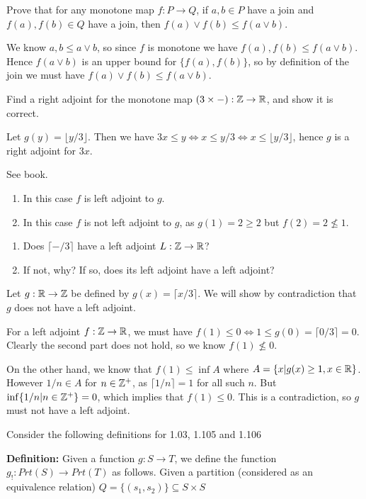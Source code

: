 Prove that for any monotone map $f:P\to Q$, if $a, b\in P$ have a join and $f(a), f(b)\in Q$ have a join, then $f(a)\lor f(b)\leq f(a\lor b)$.

\solution
We know $a,b\leq a\lor b$, so since $f$ is monotone we have $f(a), f(b)\leq f(a\lor b)$.  Hence $f(a\lor b)$ is an upper bound for $\{f(a), f(b)\}$, so by definition of the join we must have $f(a)\lor f(b)\leq f(a\lor b)$.

Find a right adjoint for the monotone map $(3\times -):\mathbb{Z}\to\mathbb{R}$, and show it is correct.

\solution
Let $g(y) = \lfloor y/3 \rfloor$.  Then we have $3x \leq y \iff x\leq y/3 \iff x\leq \lfloor y/3\rfloor$, hence $g$ is a right adjoint for $3x$.

See book.

\solution
\begin{enumerate}
	\item In this case $f$ is left adjoint to $g$.
	\item In this case $f$ is not left adjoint to $g$, as $g(1)=2\geq 2$ but $f(2)=2\nleq 1$.
\end{enumerate}

\begin{enumerate}
	\item Does $\lceil -/3\rceil$ have a left adjoint $L:\mathbb{Z}\to\mathbb{R}$?
	\item If not, why?  If so, does its left adjoint have a left adjoint?
\end{enumerate}

\solution
Let $g:\mathbb{R}\to\mathbb{Z}$ be defined by $g(x)=\lceil x/3 \rceil$.  We will show by contradiction that $g$ does not have a left adjoint.

For a left adjoint $f:\mathbb{Z}\to\mathbb{R}$, we must have $f(1)\leq 0 \iff 1\leq g(0)=\lceil 0/3\rceil=0$.  Clearly the second part does not hold, so we know $f(1)\nleq 0$.

On the other hand, we know that $f(1)\leq \inf A$ where $A=\{x | g(x)\geq 1, x\in\mathbb{R}\}$.  However $1/n\in A$ for $n\in\mathbb{Z}^+$, as $\lceil 1/n\rceil = 1$ for all such $n$.  But $\inf\{1/n | n\in\mathbb{Z}^+\}=0$, which implies that $f(1)\leq 0$.  This is a contradiction, so $g$ must not have a left adjoint.


\bigskip\noindent
Consider the following definitions for 1.03, 1.105 and 1.106

\bigskip\noindent\textbf{Definition:} Given a function $g:S \to T$, we define the function $g_!:Prt(S) \to Prt(T)$ as follows. Given a partition (considered as an equivalence relation) $Q = \{(s_1,s_2)\}\subseteq S\times S$

